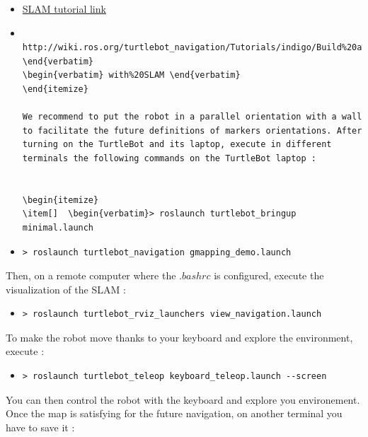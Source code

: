\documentclass[10pt,a4paper]{article}
\begin{document}
\begin{itemize}
\item[•] \href{http://wiki.ros.org/turtlebot_navigation/Tutorials/indigo/Build%20a%20map%20with%20SLAM}{SLAM tutorial link} 
\item[ ] \begin{verbatim} http://wiki.ros.org/turtlebot_navigation/Tutorials/indigo/Build%20a%20map%20 \end{verbatim} 
\begin{verbatim} with%20SLAM \end{verbatim}
\end{itemize}

We recommend to put the robot in a parallel orientation with a wall to facilitate the future definitions of markers orientations. After turning on the TurtleBot and its laptop, execute in different terminals the following commands on the TurtleBot laptop :


\begin{itemize}
\item[]  \begin{verbatim}> roslaunch turtlebot_bringup minimal.launch \end{verbatim}
\item[]  \begin{verbatim}> roslaunch turtlebot_navigation gmapping_demo.launch \end{verbatim}
\end{itemize}

Then, on a remote computer where the $.bashrc$ is configured, execute the visualization of the SLAM :

\begin{itemize}
\item[]  \begin{verbatim}> roslaunch turtlebot_rviz_launchers view_navigation.launch \end{verbatim}
\end{itemize}

To make the robot move thanks to your keyboard and explore the environment, execute :

\begin{itemize}
\item[]  \begin{verbatim}> roslaunch turtlebot_teleop keyboard_teleop.launch --screen \end{verbatim}
\end{itemize}

You can then control the robot with the keyboard and explore you environement. Once the map is satisfying for the future navigation, on another terminal you have to save it :
\end{document}
